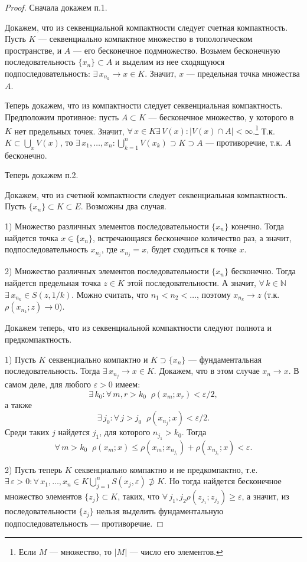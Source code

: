 \documentclass[10pt,titlepage, a4paper]{article}
\begin{document}
\begin{proof}
Сначала докажем п.1.

Докажем, что из секвенциальной компактности следует счетная
компактность. Пусть $K$ --- секвенциально компактное множество в
топологическом пространстве, и $A$ --- его бесконечное подмножество.
Возьмем бесконечную последовательность $\{x_n\}\subset A$ и выделим
из нее сходящуюся подпоследовательность: $\exists\, x_{n_k}\to x\in
K$. Значит, $x$ --- предельная точка множества $A$.

Теперь докажем, что из компактности следует секвенциальная
компактность. Предположим противное: пусть $A\subset K$ ---
бесконечное множество, у которого в $K$ нет предельных точек.
Значит, $\forall\,x\in K$\;\;$\exists\,V(x):|V(x)\cap
A|<\infty$.\footnote{Если $M$ --- множество, то $|M|$ --- число его
элементов.} Т.к. $K\subset \bigcup\limits_x V(x)$, то
$\exists\,x_1,\ldots,x_n:\bigcup\limits_{k=1}^nV(x_k)\supset
K\supset A$ --- противоречие, т.к. $A$ бесконечно.

Теперь докажем п.2.

 Докажем, что из счетной компактности следует
секвенциальная компактность. Пусть $\{x_n\}\subset K\subset E$.
Возможны два случая.

1) Множество различных элементов последовательности $\{x_n\}$
конечно. Тогда найдется точка $x\in\{x_n\}$, встречающаяся
бесконечное количество раз, а значит, подпоследовательность
${x_{n_j}}$, где $x_{n_j}=x$, будет сходиться к точке $x$.

2) Множество различных элементов последовательности $\{x_n\}$
бесконечно. Тогда найдется предельная точка $z\in K$ этой
последовательности. А значит,
$\forall\,k\in\mathbb{N}$\;\;$\exists\,x_{n_k}\in S(z,1/k)$. Можно
считать, что $n_1<n_2<\ldots$, поэтому $x_{n_k}\to z$ (т.к.
$\rho(x_{n_k};z)\to 0$).

Докажем теперь, что из секвенциальной компактности следуют полнота и
предкомпактность.

1) Пусть $K$ секвенциально компактно и $K\supset\{x_n\}$ ---
фундаментальная последовательность. Тогда $\exists\,x_{n_j}\to x\in
K$. Докажем, что в этом случае $x_n\to x$. В самом деле, для любого
$\varepsilon>0$ имеем:
$$\exists\,k_0:\forall\,m,r>k_0\;\;\rho(x_m;x_r)<\varepsilon/2,$$
а также
$$\exists\,j_0:\forall\,j>j_0\;\;\rho(x_{n_j};x)<\varepsilon/2.$$
Среди таких $j$ найдется $j_1$, для которого $n_{j_1}>k_0$. Тогда
$$\forall\,m>k_0\;\;\rho(x_m;x)\leqslant
\rho(x_m;x_{n_{j_1}})+\rho(x_{n_{j_1}};x)<\varepsilon.$$

2) Пусть теперь $K$ секвенциально компактно и не предкомпактно, т.е.
$\exists\,\varepsilon>0:\forall\,x_1,\ldots,x_n\in
K$\;\;$\bigcup\limits_{j=1}^n S(x_j,\varepsilon)\not\supset K$. Но
тогда найдется бесконечное множество элементов $\{z_j\}\subset K$,
таких, что
$\forall\,j_1,j_2$\;\;$\rho(z_{j_1};z_{j_2})\geqslant\varepsilon$, а
значит, из последовательности $\{z_j\}$ нельзя выделить
фундаментальную подпоследовательность --- противоречие.


\end{proof}
\end{document}
